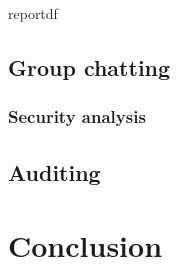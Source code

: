 \documentclass[11pt,en]{elegantpaper}
\begin{document}
reportdf





\subsection{Group chatting}

\subsubsection{Security analysis}


\subsection{Auditing}



\section{Conclusion}




\end{document}
